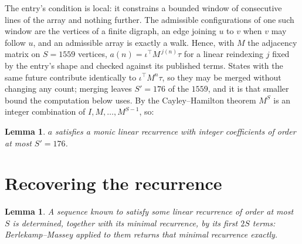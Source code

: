 \documentclass[11pt,a4paper]{article}
\theoremstyle{plain}
\newtheorem{lemma}[theorem]{Lemma}
\theoremstyle{definition}
\begin{document}
The entry's condition is local: it constrains a bounded window of consecutive lines of the
array and nothing further. The admissible configurations of one such window are the vertices
of a finite digraph, an edge joining $u$ to $v$ when $v$ may follow $u$, and an admissible
array is exactly a walk. Hence, with $M$ the adjacency matrix on $S=1559$ vertices,
$a(n)=\iota^{\!\top}M^{\,j(n)}\tau$ for a linear reindexing $j$ fixed by the entry's shape
and checked against its published terms. States with the same future contribute identically to $\iota^{\!\top}M^n\tau$, so they may be merged without changing any count; merging leaves $S'=176$ of the $1559$, and it is that smaller bound the computation below uses. By the Cayley--Hamilton theorem $M^{S}$ is an
integer combination of $I,M,\dots,M^{S-1}$, so:

\begin{lemma}\label{lem:cf}
$a$ satisfies a monic linear recurrence with integer coefficients of order at most
$S'=176$.
\end{lemma}

\section{Recovering the recurrence}

\begin{lemma}\label{lem:bm}
A sequence known to satisfy some linear recurrence of order at most $S$ is determined, together
with its minimal recurrence, by its first $2S$ terms: Berlekamp--Massey applied to them returns
that minimal recurrence exactly.
\end{lemma}
\end{document}
